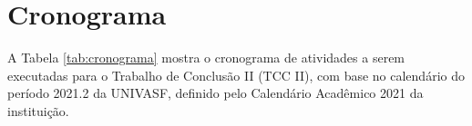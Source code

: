\begin{comment}
\begin{table}[!thb]
    \centering
    \caption{Preço dos componentes a serem utilizados 21/03/2022.}
    \begin{adjustbox}{max width={\textwidth},keepaspectratio}%
    \begin{tabular}{@{} p{6.5cm}|c|c|c| }
        \toprule
        \textbf{Componente}
        & Preço incluindo frete (USD) & 
        \\ \hline
        STM32F103C8
        & 6.92   &   36,47   
        \\ \hline
        V2 Link
        & 6.92   &  36,47  
        \\ \hline
        GPS NEO-6M 
        & 8.33   & 43,56
        \\
        \bottomrule
    \end{tabular}
    \end{adjustbox}
    \legend{\ABNTEXfontereduzida \textbf{Fonte:} O autor.}
    \label{tab:cronograma} 
\end{table}

\end{comment}









\newpage



\section{Cronograma} 
\label{sec:crono}


A Tabela \ref{tab:cronograma} mostra o cronograma de atividades a serem executadas para o Trabalho de Conclusão II (TCC II), com base no calendário do período 2021.2 da UNIVASF, definido pelo Calendário Acadêmico 2021 da instituição.

